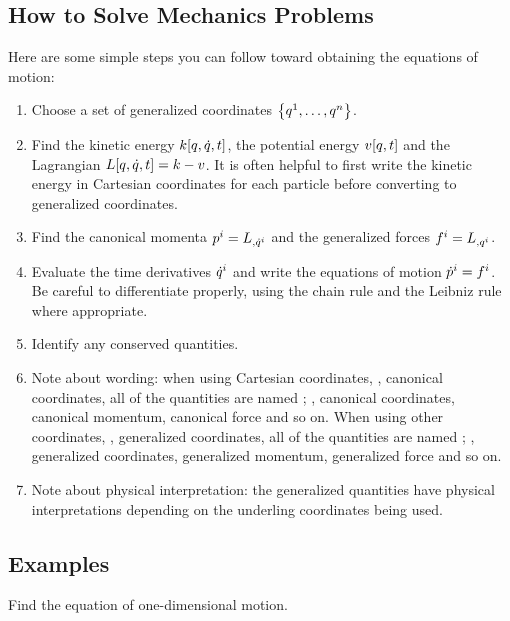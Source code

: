 \subsection{How to Solve Mechanics Problems}
Here are some simple steps you can follow toward obtaining the equations of motion:
\begin{enumerate}
\item Choose a set of generalized coordinates $\left\lbrace{{q}^{1}, \dotsc, {q}^{n}}\right\rbrace$.
%
\item Find the kinetic energy $k\!\left[{q, \dot{q}, t}\right]$, the potential energy $v\!\left[{q,t}\right]$ and the Lagrangian $L\!\left[{q,\dot{q}, t}\right] = k - v$. It is often helpful to first write the kinetic energy in Cartesian coordinates for each particle before converting to generalized coordinates.
%
\item Find the canonical momenta ${p}^{i} = {L}_{,{{\dot{q}}^{i}}}$ and the generalized forces ${f}^{i} = {L}_{,{{q}^{i}}}$.
%
\item Evaluate the time derivatives ${\dot{q}}^{i}$ and write the equations of motion ${\dot{p}}^{i} = {f}^{i}$. Be careful to differentiate properly, using the chain rule and the Leibniz rule where appropriate.
%
\item Identify any conserved quantities.
%
%
\item Note about wording: when using Cartesian coordinates, \aka, canonical coordinates, all of the quantities are named ; \eg, canonical coordinates, canonical momentum, canonical force and so on. When using other coordinates, \aka, generalized coordinates, all of the quantities are named ; \eg, generalized coordinates, generalized momentum, generalized force and so on. 
%
\item Note about physical interpretation: the generalized quantities have physical interpretations depending on the underling coordinates being used.
\end{enumerate}


\subsection{Examples}
Find the equation of one-dimensional motion. 

